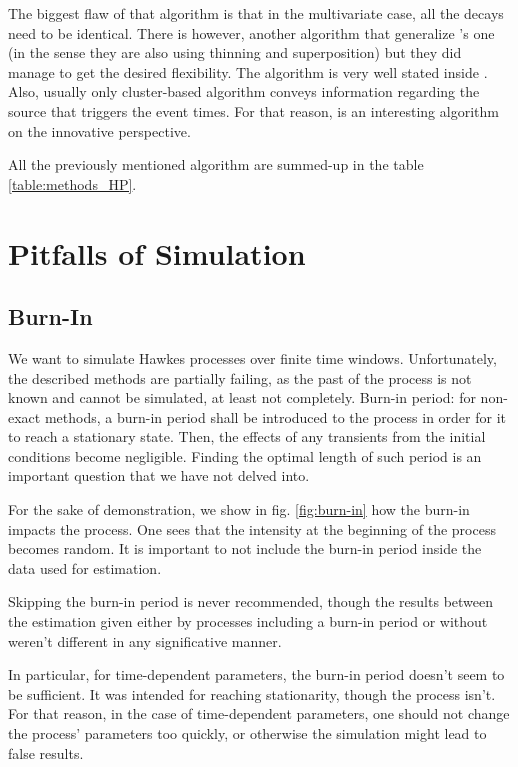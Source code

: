 The biggest flaw of that algorithm is that in the multivariate case, all the decays need to be identical. There is however, another algorithm that generalize \cite{simuldassios}'s one (in the sense they are also using thinning and superposition) but they did manage to get the desired flexibility. The algorithm is very well stated inside \cite{my_algo_simul}. Also, usually only cluster-based algorithm conveys information regarding the source that triggers the event times. For that reason, \cite{my_algo_simul} is an interesting algorithm on the innovative perspective.



All the previously mentioned algorithm are summed-up in the table \ref{table:methods_HP}.


\section{Pitfalls of Simulation}
\subsection{Burn-In}
\label{subsection:burn}
We want to simulate Hawkes processes over finite time windows. Unfortunately, the described methods are partially failing, as the past of the process is not known and cannot be simulated, at least not completely.
Burn-in period: for non-exact methods, a burn-in period shall be introduced to the process in order for it to reach a stationary state. Then, the effects of any transients from the initial conditions become negligible. Finding the optimal length of such period is an important question that we have not delved into.


For the sake of demonstration, we show in fig. \ref{fig:burn-in} how the burn-in impacts the process. One sees that the intensity at the beginning of the process becomes random. It is important to not include the burn-in period inside the data used for estimation. 

\begin{remarque}
Skipping the burn-in period is never recommended, though the results between the estimation given either by processes including a burn-in period or without weren't different in any significative manner.
\end{remarque}

In particular, for time-dependent parameters, the burn-in period doesn't seem to be sufficient. It was intended for reaching stationarity, though the process isn't. For that reason, in the case of time-dependent parameters, one should not change the process' parameters too quickly, or otherwise the simulation might lead to false results.

